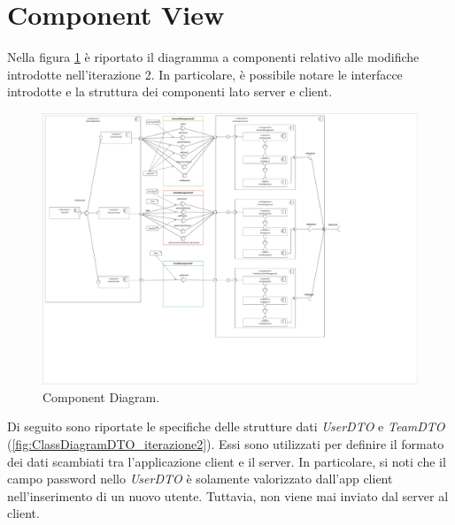 \section{Component View}
Nella figura \ref{fig:ComponentDiagram_iterazione2} è riportato il diagramma a componenti relativo alle modifiche introdotte nell'iterazione 2. In particolare, è possibile notare le interfacce introdotte e la struttura dei componenti lato server e client.

\begin{figure}[h!]
	\centering
	\includegraphics[width=1\linewidth]{./Iterazione 2/OtherFiles/UML - Component View}
	\caption{Component Diagram.}
	\label{fig:ComponentDiagram_iterazione2}
\end{figure}

\clearpage

Di seguito sono riportate le specifiche delle strutture dati \textit{UserDTO} e \textit{TeamDTO} (\Fig\ref{fig:ClassDiagramDTO_iterazione2}). Essi sono utilizzati per definire il formato dei dati scambiati tra l'applicazione client e il server. In particolare, si noti che il campo password nello \textit{UserDTO} è solamente valorizzato dall'app client nell'inserimento di un nuovo utente. Tuttavia, non viene mai inviato dal server al client.  

